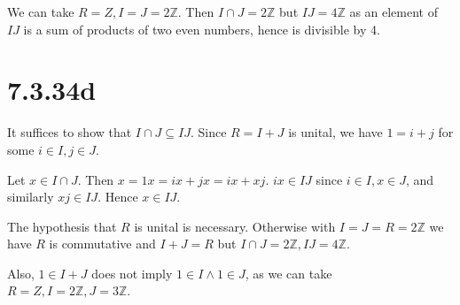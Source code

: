 \documentclass{article}
\def\Z{\mathbb{Z}}
\begin{document}
We can take $R = Z, I = J = 2\Z$. Then $I \cap J = 2\Z$ but $IJ = 4\Z$ as an element of $IJ$ is a sum of products of two even numbers, hence is divisible by 4.

\section*{7.3.34d}

It suffices to show that $I \cap J \subseteq IJ$. Since $R = I + J$ is unital, we have $1 = i + j$ for some $i \in I, j \in J$.

Let $x \in I \cap J$. Then $x = 1x = ix + jx = ix + xj$. $ix \in IJ$ since $i \in I, x \in J$, and similarly $xj \in IJ$. Hence $x \in IJ$.

The hypothesis that $R$ is unital is necessary. Otherwise with $I = J = R = 2\Z$ we have $R$ is commutative and $I + J = R$ but $I \cap J = 2\Z, IJ = 4\Z$.

Also, $1 \in I + J$ does not imply $1 \in I \wedge 1 \in J$, as we can take $R = Z, I = 2\Z, J = 3\Z$.
\end{document}

